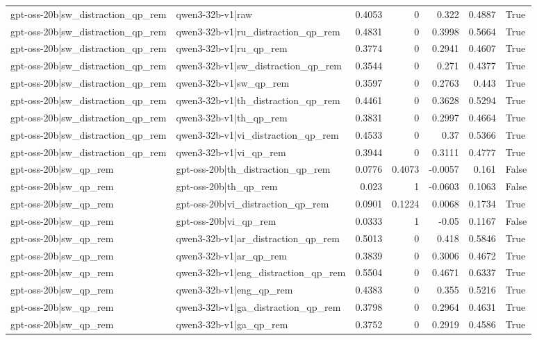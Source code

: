 \begin{table}
\begin{tabular}{l l r r r r l}
gpt-oss-20b|sw_distraction_qp_rem & qwen3-32b-v1|raw & 0.4053 & 0 & 0.322 & 0.4887 & True \\
gpt-oss-20b|sw_distraction_qp_rem & qwen3-32b-v1|ru_distraction_qp_rem & 0.4831 & 0 & 0.3998 & 0.5664 & True \\
gpt-oss-20b|sw_distraction_qp_rem & qwen3-32b-v1|ru_qp_rem & 0.3774 & 0 & 0.2941 & 0.4607 & True \\
gpt-oss-20b|sw_distraction_qp_rem & qwen3-32b-v1|sw_distraction_qp_rem & 0.3544 & 0 & 0.271 & 0.4377 & True \\
gpt-oss-20b|sw_distraction_qp_rem & qwen3-32b-v1|sw_qp_rem & 0.3597 & 0 & 0.2763 & 0.443 & True \\
gpt-oss-20b|sw_distraction_qp_rem & qwen3-32b-v1|th_distraction_qp_rem & 0.4461 & 0 & 0.3628 & 0.5294 & True \\
gpt-oss-20b|sw_distraction_qp_rem & qwen3-32b-v1|th_qp_rem & 0.3831 & 0 & 0.2997 & 0.4664 & True \\
gpt-oss-20b|sw_distraction_qp_rem & qwen3-32b-v1|vi_distraction_qp_rem & 0.4533 & 0 & 0.37 & 0.5366 & True \\
gpt-oss-20b|sw_distraction_qp_rem & qwen3-32b-v1|vi_qp_rem & 0.3944 & 0 & 0.3111 & 0.4777 & True \\
gpt-oss-20b|sw_qp_rem & gpt-oss-20b|th_distraction_qp_rem & 0.0776 & 0.4073 & -0.0057 & 0.161 & False \\
gpt-oss-20b|sw_qp_rem & gpt-oss-20b|th_qp_rem & 0.023 & 1 & -0.0603 & 0.1063 & False \\
gpt-oss-20b|sw_qp_rem & gpt-oss-20b|vi_distraction_qp_rem & 0.0901 & 0.1224 & 0.0068 & 0.1734 & True \\
gpt-oss-20b|sw_qp_rem & gpt-oss-20b|vi_qp_rem & 0.0333 & 1 & -0.05 & 0.1167 & False \\
gpt-oss-20b|sw_qp_rem & qwen3-32b-v1|ar_distraction_qp_rem & 0.5013 & 0 & 0.418 & 0.5846 & True \\
gpt-oss-20b|sw_qp_rem & qwen3-32b-v1|ar_qp_rem & 0.3839 & 0 & 0.3006 & 0.4672 & True \\
gpt-oss-20b|sw_qp_rem & qwen3-32b-v1|eng_distraction_qp_rem & 0.5504 & 0 & 0.4671 & 0.6337 & True \\
gpt-oss-20b|sw_qp_rem & qwen3-32b-v1|eng_qp_rem & 0.4383 & 0 & 0.355 & 0.5216 & True \\
gpt-oss-20b|sw_qp_rem & qwen3-32b-v1|ga_distraction_qp_rem & 0.3798 & 0 & 0.2964 & 0.4631 & True \\
gpt-oss-20b|sw_qp_rem & qwen3-32b-v1|ga_qp_rem & 0.3752 & 0 & 0.2919 & 0.4586 & True \\

\end{tabular}
\end{table}
